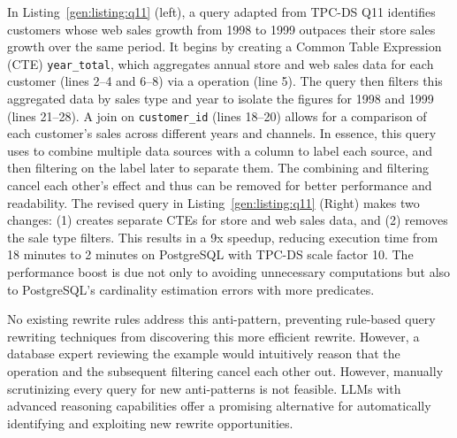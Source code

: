  In Listing~\ref{gen:listing:q11} (left), a query adapted from TPC-DS Q11 identifies customers whose web sales growth from 1998 to 1999 outpaces their store sales growth over the same period. It begins by creating a Common Table Expression (CTE) \texttt{year\_total}, which aggregates annual store and web sales data for each customer (lines 2–4 and 6–8) via a \sqlunionallcolor operation (line 5). The query then filters this aggregated data by sales type and year to isolate the figures for 1998 and 1999 (lines 21–28). A join on \texttt{customer\_id} (lines 18–20) allows for a comparison of each customer's sales across different years and channels. In essence, this query uses \sqlunionallcolor to combine multiple data sources with a column to label each source, and then filtering on the label later to separate them. The combining and filtering cancel each other's effect and thus can be removed for better performance and readability.
 The revised query in Listing~\ref{gen:listing:q11} (Right) makes two changes: (1) creates separate CTEs for store and web sales data, and (2) removes the sale type filters. This results in a 9x speedup, reducing execution time from 18 minutes to 2 minutes on PostgreSQL with TPC-DS scale factor 10. The performance boost is due not only to avoiding unnecessary computations but also to PostgreSQL's cardinality estimation errors with more predicates.

No existing rewrite rules address this anti-pattern, preventing rule-based query rewriting techniques from discovering this more efficient rewrite. However, a database expert reviewing the example would intuitively reason that the \sqlunionallcolor operation and the subsequent filtering cancel each other out. However, manually scrutinizing every query for new anti-patterns is not feasible. LLMs with advanced reasoning capabilities offer a promising alternative for automatically identifying and exploiting new rewrite opportunities.


